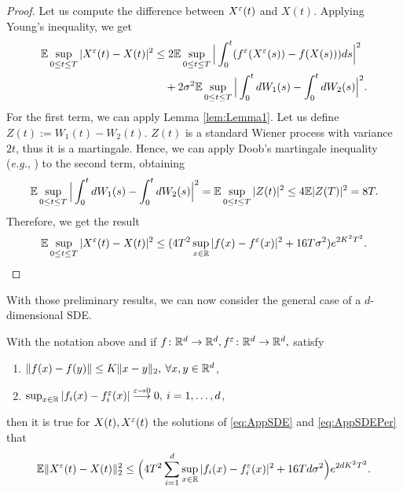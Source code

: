 \begin{proof} Let us compute the difference between $X^\varepsilon(t)$ and $X(t)$. Applying Young's inequality, we get
\begin{equation*}
\begin{aligned}
	\mathbb{E} \sup_{0 \leq t \leq T} |X^\varepsilon(t) - X(t)|^2 &\leq 2\mathbb{E} \sup_{0 \leq t \leq T}\Big|\int_0^t (f^\varepsilon (X^\varepsilon(s)) - f(X(s)))ds \Big|^2 \\
		&\quad + 2\sigma^2 \mathbb{E} \sup_{0 \leq t \leq T} \Big|\int_0^t dW_1(s) - \int_0^t dW_2(s)  \Big|^2.
\end{aligned}
\end{equation*}
For the first term, we can apply Lemma \ref{lem:Lemma1}. Let us define $Z(t) := W_1(t) - W_2(t)$. $Z(t)$ is a standard Wiener process with variance $2t$, thus it is a martingale. Hence, we can apply Doob's martingale inequality (\textit{e.g.}, \cite{Wang1991}) to the second term, obtaining
\begin{equation*}
	\mathbb{E} \sup_{0 \leq t \leq T} \Big|\int_0^t dW_1(s) - \int_0^t dW_2(s)  \Big|^2 = \mathbb{E} \sup_{0 \leq t \leq T} | Z(t) |^2 \leq 4 \mathbb{E} |Z(T)|^2 = 8T.
\end{equation*}
Therefore, we get the result
\begin{equation*}
	\mathbb{E} \sup_{0 \leq t \leq T} |X^\varepsilon(t) - X(t)|^2 \leq (4T^2 \sup_{x\in \mathbb{R}}|f(x) - f^\varepsilon(x)|^2 + 16T\sigma^2) e^{2K^2T^2}.
\end{equation*}
\end{proof}
\noindent With those preliminary results, we can now consider the general case of a $d$-dimensional SDE.
\begin{theorem}\label{th:Prop} With the notation above and if $f\colon \mathbb{R}^d \rightarrow \mathbb{R}^d, f^\varepsilon\colon \mathbb{R}^d \rightarrow \mathbb{R}^d,$ satisfy
\begin{enumerate}
	\item $\|f(x) - f(y)\| \leq K\|x - y\|_2, \: \forall x,y \in \mathbb{R}^d$,
 	\item $\sup_{x\in \mathbb{R}}|f_i(x) - f_i^\varepsilon(x)| \stackrel{\varepsilon \rightarrow 0}\longrightarrow 0, \: i = 1, \dots, d$,
\end{enumerate}
then it is true for $X(t), X^\varepsilon(t)$ the solutions of \eqref{eq:AppSDE} and \eqref{eq:AppSDEPer} that 
\begin{equation}\label{eq:Proposition}
	\mathbb{E} \| X^\varepsilon(t) - X(t) \|_2^2 \leq \Big(4T^2 \sum_{i=1}^d \sup_{x\in \mathbb{R}}|f_i(x) - f_i^\varepsilon(x)|^2 + 16Td\sigma^2\Big)e^{2dK^2T^2}.
\end{equation}
\end{theorem}
